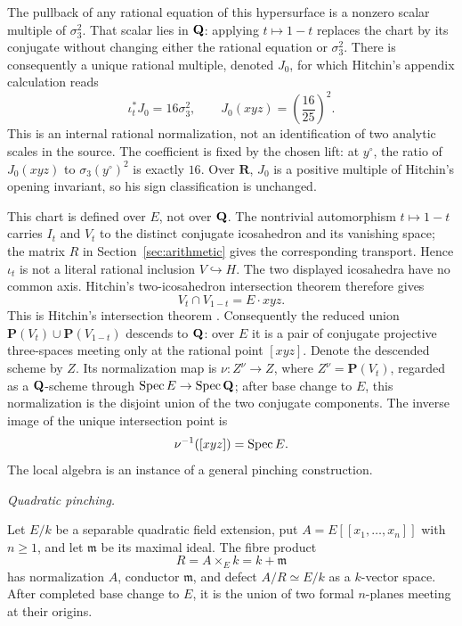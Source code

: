 The pullback of any rational equation of this hypersurface is a nonzero
scalar multiple of \(\sigma_3^2\).  That scalar lies in \(\mathbf Q\): applying
\(t\mapsto1-t\) replaces the chart by its conjugate without changing either
the rational equation or \(\sigma_3^2\).  There is consequently a unique
rational multiple, denoted \(J_0\), for which Hitchin's appendix calculation
\cite[Appendix, final displayed formula]{HitchinIcosahedron} reads
\[
 \iota_t^*J_0=16\sigma_3^2,
 \qquad J_0(xyz)=\left(\frac{16}{25}\right)^2.
\]
This is an internal rational normalization, not an identification of two
analytic scales in the source.  The coefficient is fixed by the chosen
lift: at \(y^\circ\), the ratio of \(J_0(xyz)\) to
\(\sigma_3(y^\circ)^2\) is exactly \(16\).  Over \(\mathbf R\), \(J_0\) is a
positive multiple of Hitchin's opening invariant, so his sign
classification is unchanged.

This chart is defined over \(E\), not over \(\mathbf Q\).  The nontrivial
automorphism \(t\mapsto1-t\) carries \(I_t\) and \(V_t\) to the distinct
conjugate icosahedron and its vanishing space; the matrix \(R\) in
Section~\ref{sec:arithmetic} gives the corresponding transport.  Hence
\(\iota_t\) is not a literal rational inclusion \(V\hookrightarrow H\).
The two displayed icosahedra have no common axis.  Hitchin's
two-icosahedron intersection theorem therefore gives
\[
 V_t\cap V_{1-t}=E\cdot xyz.
\]
This is Hitchin's intersection theorem
\cite[Proposition~7]{HitchinIcosahedron}.
Consequently the reduced union
\(\mathbf P(V_t)\cup\mathbf P(V_{1-t})\) descends to \(\mathbf Q\): over \(E\) it
is a pair of conjugate projective three-spaces meeting only at the rational
point \([xyz]\).  Denote the descended scheme by \(Z\).  Its normalization
map is \(\nu:Z^\nu\to Z\), where \(Z^\nu=\mathbf P(V_t)\), regarded as a
\(\mathbf Q\)-scheme through
\(\operatorname{Spec} E\to\operatorname{Spec}\mathbf Q\); after base change to \(E\), this normalization is
the disjoint union of the two conjugate components.  The inverse image of
the unique intersection point is
\[
 \nu^{-1}([xyz])=\operatorname{Spec} E.
\]
The local algebra is an instance of a general pinching construction.

\smallskip
\noindent\emph{Quadratic pinching.}\par
Let \(E/k\) be a separable quadratic field extension, put
\(A=E[[x_1,\ldots,x_n]]\) with \(n\geq1\), and let \(\mathfrak m\) be its
maximal ideal.
The fibre product
\[
 R=A\mathbin{\times_E}k=k+\mathfrak m
\]
has normalization \(A\), conductor \(\mathfrak m\), and defect
\(A/R\simeq E/k\) as a \(k\)-vector space.  After completed base change to
\(E\), it is the union
of two formal \(n\)-planes meeting at their origins.

